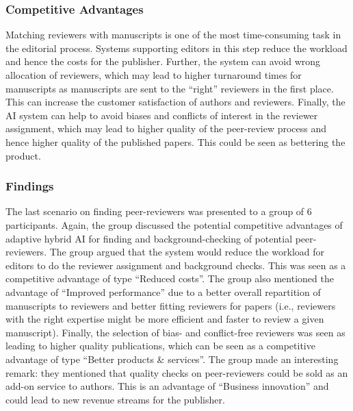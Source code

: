 \subsubsection*{Competitive Advantages} 

Matching reviewers with manuscripts is one of the most time-consuming task in the editorial process. Systems supporting editors in this 
step reduce the workload and hence the costs for the publisher. Further, the system can avoid wrong allocation of reviewers, which may lead
to higher turnaround times for manuscripts as manuscripts are sent to the ``right'' reviewers in the first place. This can increase the
customer satisfaction of authors and reviewers. Finally, the AI system can help to avoid biases and conflicts of interest in the reviewer
assignment, which may lead to higher quality of the peer-review process and hence higher quality of the published papers. This could be 
seen as bettering the product.

\subsubsection*{Findings}

The last scenario on finding peer-reviewers was presented to a group of 6 participants. Again, the group discussed the potential
competitive advantages of adaptive hybrid AI for finding and background-checking of potential peer-reviewers. The group argued that
the system would reduce the workload for editors to do the reviewer assignment and background checks. This was seen as a competitive advantage
of type ``Reduced costs''. The group also mentioned the advantage of ``Improved performance'' due to a better overall repartition of manuscripts to
reviewers and better fitting reviewers for papers (i.e., reviewers with the right expertise might be more efficient and faster to review a
given manuscript). Finally, the selection of bias- and conflict-free reviewers was seen as leading to higher quality publications, which 
can be seen as a competitive advantage of type ``Better products \& services''. The group made an interesting remark: they mentioned that 
quality checks on peer-reviewers could be sold as an add-on service to authors. This is an advantage of ``Business innovation'' and could 
lead to new revenue streams for the publisher.
